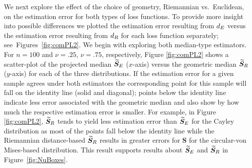 We next explore the effect of the choice of geometry, Riemannian vs.~Euclidean, on the estimation error for both types of loss functions. To provide more insight into possible differences we plotted the estimation error resulting from ${d_E}$ versus the estimation error resulting from ${d_R}$ for each loss function separately; see~Figures~\ref{fig:comPL2}.  
We begin with exploring both median-type estimators. For $n=100$ and $\nu=.25$,  $\nu=.75$, respectively, Figure \ref{fig:comPL2} shows a scatter-plot of the projected median ${\widetilde{\bm S}_E}$ ($x$-axis) versus  the geometric median ${\widetilde{\bm S}_R}$ ($y$-axis) for each of the three distributions.  If the estimation error for a given sample agrees under both estimators the corresponding point for this sample will fall on the identity line (solid and diagonal); points below the identity line indicate less error associated with the geometric median and also show by how much the respective estimation error is smaller. For example, in Figure \ref{fig:comPL2},  ${\widetilde{\bm S}_R}$ tends to yield less estimation error than ${\widetilde{\bm S}_E}$  for the Cayley distribution as most of the points fall below the identity line while the Riemannian distance-based ${\widetilde{\bm S}_R}$ results in greater errors for ${\bm S}$ for the circular-von Mises-based distribution.  This result supports results about ${\widetilde{\bm S}_E}$ and ${\widetilde{\bm S}_R}$ in Figure~\ref{fig:NuBoxes}.

